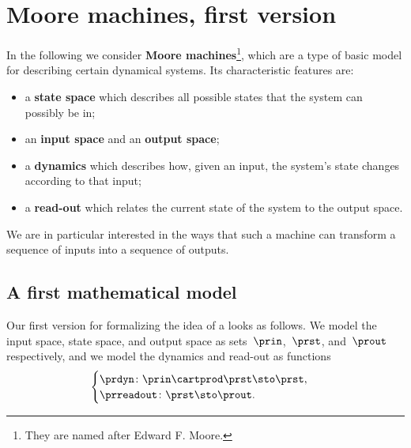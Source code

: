 
\section{Moore machines, first version}
\label{sec:moore-machines}



In the following we consider \textbf{Moore machines}\footnote{They are named after Edward F.
    Moore.
}, which are a type of basic model for describing certain dynamical systems.
Its characteristic features are:
\begin{itemize}
    \item a \textbf{state space} which describes all possible states that the system can possibly be in;
    \item an \textbf{input space} and an \textbf{output space};
    \item a \textbf{dynamics} which describes how, given an input, the system's state changes according to that input;
    \item a \textbf{read-out} which relates the current state of the system to the output space.
\end{itemize}
%
We are in particular interested in the ways that such a machine can transform a sequence of inputs into a sequence of outputs.

\subsection{A first mathematical model}

Our first version for formalizing the idea of a  looks as follows.
We model the input space, state space, and output space as sets~$\prin$,~$\prst$, and~$\prout$ respectively, and we model the dynamics and read-out as functions
\begin{equation}
    \label{eq:moore-1}
    \begin{cases}
        \prdyn \colon \prin \cartprod \prst \sto \prst, \\
        \prreadout \colon \prst \sto \prout.
    \end{cases}
\end{equation}


